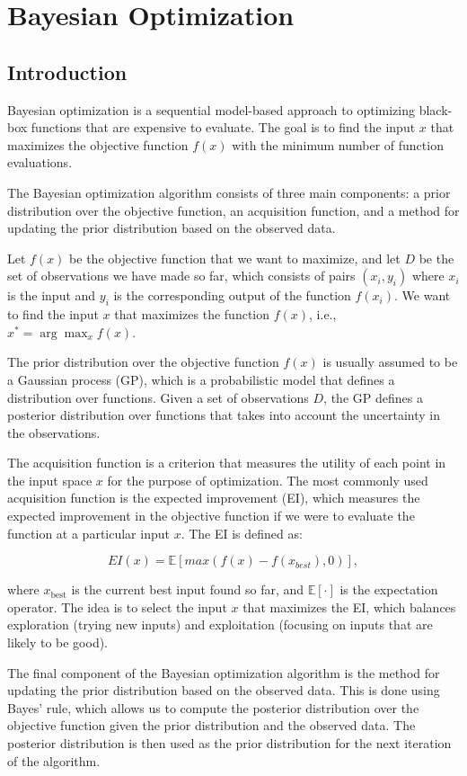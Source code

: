 \chapter{Bayesian Optimization}

\section{Introduction}

Bayesian optimization is a sequential model-based approach to optimizing black-box functions that are expensive to evaluate. The goal is to find the input $x$ that maximizes the objective function $f(x)$ with the minimum number of function evaluations.

The Bayesian optimization algorithm consists of three main components: a prior distribution over the objective function, an acquisition function, and a method for updating the prior distribution based on the observed data.

Let $f(x)$ be the objective function that we want to maximize, and let $D$ be the set of observations we have made so far, which consists of pairs $(x_i, y_i)$ where $x_i$ is the input and $y_i$ is the corresponding output of the function $f(x_i)$. We want to find the input $x$ that maximizes the function $f(x)$, i.e., $x^* = \arg\max_x f(x)$.

The prior distribution over the objective function $f(x)$ is usually assumed to be a Gaussian process (GP), which is a probabilistic model that defines a distribution over functions. Given a set of observations $D$, the GP defines a posterior distribution over functions that takes into account the uncertainty in the observations.

The acquisition function is a criterion that measures the utility of each point in the input space $x$ for the purpose of optimization. The most commonly used acquisition function is the expected improvement (EI), which measures the expected improvement in the objective function if we were to evaluate the function at a particular input $x$. The EI is defined as:

\[ EI(x) = \mathbb{E}[max(f(x) - f(x_{best}), 0)], \]

where $x_{\text{best}}$ is the current best input found so far, and $\mathbb{E}[\cdot]$ is the expectation operator. The idea is to select the input $x$ that maximizes the EI, which balances exploration (trying new inputs) and exploitation (focusing on inputs that are likely to be good).

The final component of the Bayesian optimization algorithm is the method for updating the prior distribution based on the observed data. This is done using Bayes' rule, which allows us to compute the posterior distribution over the objective function given the prior distribution and the observed data. The posterior distribution is then used as the prior distribution for the next iteration of the algorithm.
